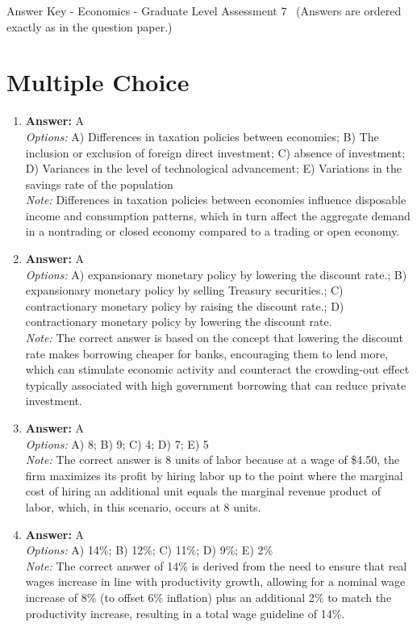 \documentclass[12pt]{article}
\begin{document}
\begin{center}
Answer Key - Economics - Graduate Level Assessment 7 \
\small (Answers are ordered exactly as in the question paper.)
\end{center}

\section*{Multiple Choice}
\begin{enumerate}[label=\arabic*.]
\item \textbf{Answer:} A
\\ \textit{Options:} A) Differences in taxation policies between economies; B) The inclusion or exclusion of foreign direct investment; C) absence of investment; D) Variances in the level of technological advancement; E) Variations in the savings rate of the population
\\ \textit{Note:} Differences in taxation policies between economies influence disposable income and consumption patterns, which in turn affect the aggregate demand in a nontrading or closed economy compared to a trading or open economy.
\item \textbf{Answer:} A
\\ \textit{Options:} A) expansionary monetary policy by lowering the discount rate.; B) expansionary monetary policy by selling Treasury securities.; C) contractionary monetary policy by raising the discount rate.; D) contractionary monetary policy by lowering the discount rate.
\\ \textit{Note:} The correct answer is based on the concept that lowering the discount rate makes borrowing cheaper for banks, encouraging them to lend more, which can stimulate economic activity and counteract the crowding-out effect typically associated with high government borrowing that can reduce private investment.
\item \textbf{Answer:} A
\\ \textit{Options:} A) 8; B) 9; C) 4; D) 7; E) 5
\\ \textit{Note:} The correct answer is 8 units of labor because at a wage of \$4.50, the firm maximizes its profit by hiring labor up to the point where the marginal cost of hiring an additional unit equals the marginal revenue product of labor, which, in this scenario, occurs at 8 units.
\item \textbf{Answer:} A
\\ \textit{Options:} A) 14\%; B) 12\%; C) 11\%; D) 9\%; E) 2\%
\\ \textit{Note:} The correct answer of 14\% is derived from the need to ensure that real wages increase in line with productivity growth, allowing for a nominal wage increase of 8\% (to offset 6\% inflation) plus an additional 2\% to match the productivity increase, resulting in a total wage guideline of 14\%.

\end{enumerate}
\end{document}
